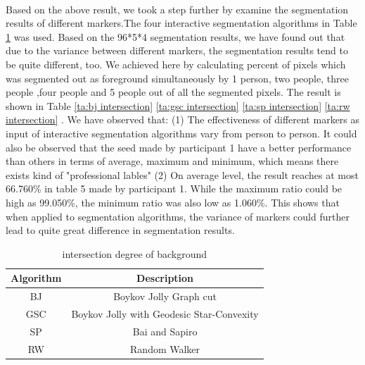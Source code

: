 \documentclass[runningheads,a4paper]{llncs}
\begin{document}
\paragraph{}Based on the above result, we took a step further by examine the segmentation results of different markers.The four interactive segmentation algorithms \citep{boykov2001interactive}\citep{grady2006random}\citep{bai2007geodesic}\citep{gulshan2010geodesic}in Table \ref{ta:algorithms} was used. Based on the 96*5*4 segmentation results, we have found out that due to the variance between different markers, the segmentation results tend to be quite different, too.  We achieved here by calculating percent of pixels which was segmented out as foreground simultaneously by 1 person, two people, three people ,four people and 5 people out of all the segmented pixels. The result is shown in Table \ref{ta:bj intersection} \ref{ta:gsc intersection} \ref{ta:sp intersection} \ref{ta:rw intersection}
. We have observed that: (1) The effectiveness of different markers as input of interactive segmentation algorithms vary from person to person.  It could also be observed that the seed made by participant 1 have a better performance than others in terms of average, maximum and minimum, which means there exists kind of "professional lables" \citep{fu2008saliency} (2) On average level, the result reaches at most 66.760\% in table 5 made by participant 1. While the maximum ratio could be high as 99.050\%, the minimum ratio was also low as 1.060\%. This shows that when applied to segmentation algorithms, the variance of markers could further lead to quite great difference in segmentation results. 


\begin{table}
\centering
\begin{tabular}{|c|c|}
\hline
Algorithm & Description\\
\hline
BJ &  Boykov Jolly Graph cut  \\
\hline
GSC & Boykov Jolly with Geodesic Star-Convexity \\
\hline
SP & Bai and Sapiro \\
\hline
RW & Random Walker  \\
\hline
\end{tabular}
\caption{intersection degree of background}
\label{ta:algorithms}
\end{table} 
\end{document}
